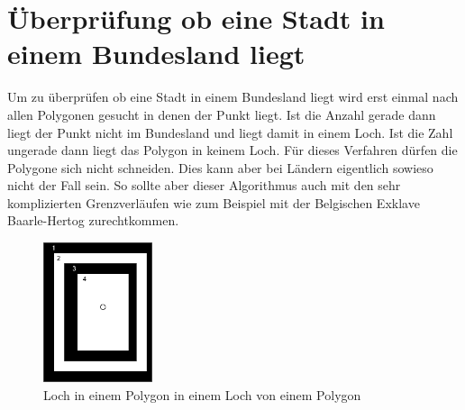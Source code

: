 \documentclass[conference]{IEEEtran}
\begin{document}
	\section{Überprüfung ob eine Stadt in einem Bundesland liegt}
	Um zu überprüfen ob eine Stadt in einem Bundesland liegt wird erst einmal nach allen Polygonen gesucht in denen der Punkt liegt. Ist die Anzahl gerade dann liegt der Punkt nicht im Bundesland und liegt damit in einem Loch. Ist die Zahl ungerade dann liegt das Polygon in keinem Loch. Für dieses Verfahren dürfen die Polygone sich nicht schneiden. Dies kann aber bei Ländern eigentlich sowieso nicht der Fall sein. So sollte aber dieser Algorithmus auch mit den sehr komplizierten Grenzverläufen wie zum Beispiel mit der Belgischen Exklave Baarle-Hertog zurechtkommen.
	\begin{figure}[h]
		\begin{center}
			\includegraphics[width=3.2cm]{StadtInBundesland.png}
			\caption{Loch in einem Polygon in einem Loch von einem Polygon}
			\label{	StadtInBundesland}
		\end{center}
	\end{figure}\\
\end{document}
